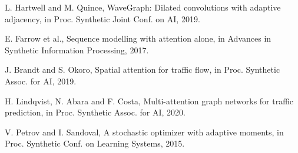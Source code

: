 \documentclass[10pt,twocolumn]{article}
\begin{document}
\noindent [3] L. Hartwell and M. Quince, WaveGraph: Dilated convolutions with adaptive adjacency, in Proc. Synthetic Joint Conf. on AI, 2019.

\noindent [4] E. Farrow et al., Sequence modelling with attention alone, in Advances in Synthetic Information Processing, 2017.

\noindent [5] J. Brandt and S. Okoro, Spatial attention for traffic flow, in Proc. Synthetic Assoc. for AI, 2019.

\noindent [6] H. Lindqvist, N. Abara and F. Costa, Multi-attention graph networks for traffic prediction, in Proc. Synthetic Assoc. for AI, 2020.

\noindent [7] V. Petrov and I. Sandoval, A stochastic optimizer with adaptive moments, in Proc. Synthetic Conf. on Learning Systems, 2015.
\end{document}
